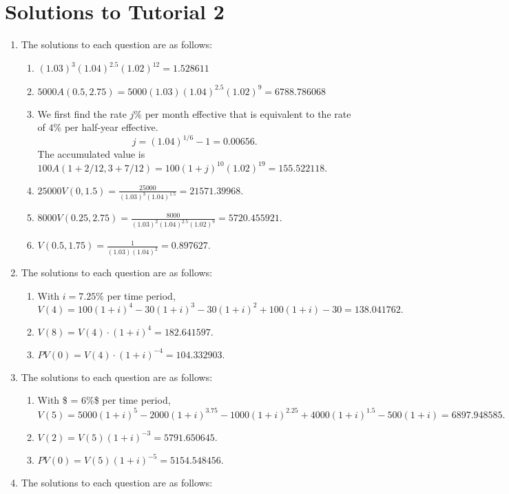 \documentclass[
]{article}
\providecommand{\tightlist}{%
  \setlength{\itemsep}{0pt}\setlength{\parskip}{0pt}}
\theoremstyle{definition}
\theoremstyle{definition}
\theoremstyle{definition}
\theoremstyle{definition}
\theoremstyle{remark}
\begin{document}
\hypertarget{solutions-to-tutorial-2}{%
\section{Solutions to Tutorial 2}\label{solutions-to-tutorial-2}}

\begin{enumerate}
\def\labelenumi{\arabic{enumi}.}
\item
  The solutions to each question are as follows:

  \begin{enumerate}
  \def\labelenumii{\arabic{enumii}.}
  \tightlist
  \item
    \((1.03)^3(1.04)^{2.5} (1.02)^{12} = 1.528611\)
  \item
    \(5000A(0.5,2.75) = 5000(1.03)(1.04)^{2.5} (1.02)^{9} = 6788.786068\)
  \item
    We first find the rate \(j\%\) per month effective that is equivalent to the rate of \(4\%\) per half-year effective.
    \[j = (1.04)^{1/6} - 1 = 0.00656.\]
    The accumulated value is \(100A(1+2/12, 3 + 7/12 ) = 100(1+j)^{10}(1.02)^{19} = 155.522118.\)
  \item
    \(25000V(0,1.5) = \frac{25000}{(1.03)^3(1.04)^{1.5}} = 21571.39968.\)
  \item
    \(8000V(0.25,2.75) = \frac{8000}{(1.03)^2(1.04)^{2.5}(1.02)^{9}} = 5720.455921.\)
  \item
    \(V(0.5,1.75) = \frac{1}{(1.03)(1.04)^{2}} = 0.897627.\)
  \end{enumerate}
\item
  The solutions to each question are as follows:

  \begin{enumerate}
  \def\labelenumii{\arabic{enumii}.}
  \tightlist
  \item
    With \(i = 7.25\%\) per time period, \(V(4) = 100 (1+i)^4 - 30(1+i)^3 - 30 (1+i)^2 + 100 (1+i) - 30 = 138.041762.\)
  \item
    \(V(8) = V(4)\cdot (1+i)^4 = 182.641597.\)
  \item
    \(PV(0) = V(4)\cdot (1+i)^{-4} = 104.332903.\)
  \end{enumerate}
\item
  The solutions to each question are as follows:

  \begin{enumerate}
  \def\labelenumii{\arabic{enumii}.}
  \tightlist
  \item
    With \$ = 6\%\$ per time period, \(V(5) = 5000 (1+i)^5 - 2000(1+i)^{3.75} - 1000 (1+i)^{2.25} + 4000 (1+i)^{1.5} - 500(1+i) = 6897.948585.\)
  \item
    \(V(2) = V(5)(1+i)^{-3} = 5791.650645.\)
  \item
    \(PV(0) = V(5)(1+i)^{-5} = 5154.548456.\)
  \end{enumerate}
\item
  The solutions to each question are as follows:


\end{enumerate}
\end{document}
